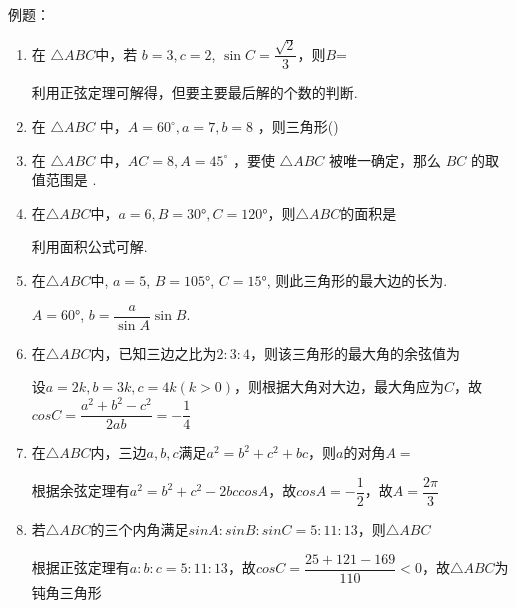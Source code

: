例题：
\begin{enumerate}
    \item 在 $\triangle{ABC}$中，若 $b=3, c=2$, $\sin C=\dfrac{\sqrt{2}}{3}$，则$B$=
    \begin{jieda}
        利用正弦定理可解得，但要主要最后解的个数的判断.
    \end{jieda}
    
    \item 在 $\triangle A B C$ 中，$A=60^{\circ}, a=7, b=8$ ，则三角形\dotfill()

    \item 在 $\triangle A B C$ 中，$A C=8, A=45^{\circ}$ ，要使 $\triangle A B C$ 被唯一确定，那么 $B C$ 的取值范围是 \blkda[3]{$\{4 \sqrt{2}\} \cup[8,+\infty)$}.
    
    \item 在$\triangle{ABC}$中，$a=6,B=\ang{30},C=\ang{120}$，则$\triangle{ABC}$的面积是
    \begin{jieda}
        利用面积公式可解.
    \end{jieda}
    
    
    \item  在$\triangle{ABC}$中, $a=5$, $B=\ang{105}$, $C=\ang{15}$, 则此三角形的最大边的长为.
    \begin{jieda}
    $A=\ang{60}$, $b=\dfrac{a}{\sin{A}}\sin{B}$. 
    \end{jieda}

    \item 在$\triangle{ABC}$内，已知三边之比为$2:3:4$，则该三角形的最大角的余弦值为
    \begin{jieda}
        设$a = 2k, b = 3k, c = 4k (k > 0)$，则根据大角对大边，最大角应为$C$，故$cosC = \dfrac{a^2 + b^2 - c^2}{2ab} = -\dfrac{1}{4}$
    \end{jieda}
    \item 在$\triangle{ABC}$内，三边$a, b, c$满足$a^2=b^2+c^2+bc$，则$a$的对角$A = $
    \begin{jieda}
        根据余弦定理有$a^2=b^2+c^2-2bccosA$，故$cosA = -\dfrac{1}{2}$，故$A = \dfrac{2\pi}{3}$
    \end{jieda}
    \item 若$\triangle{ABC}$的三个内角满足$sinA : sinB : sinC = 5: 11: 13$，则$\triangle{ABC}$ 
    \begin{jieda}
        根据正弦定理有$a: b : c = 5 : 11 : 13$，故$cosC = \dfrac{25 + 121 - 169}{110} < 0$，故$\triangle{ABC}$为钝角三角形
    \end{jieda}


\end{enumerate}
